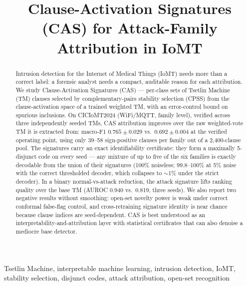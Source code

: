 \documentclass[conference]{IEEEtran}
\begin{document}
\title{Clause-Activation Signatures (CAS) for Attack-Family Attribution in IoMT}

\author{
}

\maketitle

\begin{abstract}
Intrusion detection for the Internet of Medical Things (IoMT) needs more
than a correct label: a forensic analyst needs a compact, auditable reason
for each attribution. We study Clause-Activation Signatures (CAS) ---
per-class sets of Tsetlin Machine (TM) clauses selected by
complementary-pairs stability selection (CPSS) from the clause-activation
space of a trained weighted TM, with an error-control bound on spurious
inclusions. On CICIoMT2024 (WiFi/MQTT, family level), verified across three
independently seeded TMs, CAS attribution improves over the raw
weighted-vote TM it is extracted from: macro-F1 $0.765 \pm 0.029$ vs.\
$0.692 \pm 0.004$ at the verified operating point, using only 39--58
sign-positive clauses per family out of a 2{,}400-clause pool. The
signatures carry an exact identifiability certificate: they form a maximally
5-disjunct code on every seed --- any mixture of up to five of the six
families is exactly decodable from the union of their signatures (100\%
noiseless; 99.8--100\% at 5\% noise with the correct thresholded decoder,
which collapses to $\sim$1\% under the strict decoder). In a binary
normal-vs-attack reduction, the attack signature lifts ranking quality over
the base TM (AUROC 0.940 vs.\ 0.819, three seeds). We also report two
negative results without smoothing: open-set novelty power is weak under
correct conformal false-flag control, and cross-retraining signature
identity is near chance because clause indices are seed-dependent. CAS is
best understood as an interpretability-and-attribution layer with
statistical certificates that can also denoise a mediocre base detector.
\end{abstract}

\begin{IEEEkeywords}
Tsetlin Machine, interpretable machine learning, intrusion detection, IoMT,
stability selection, disjunct codes, attack attribution, open-set
recognition
\end{IEEEkeywords}
\end{document}
